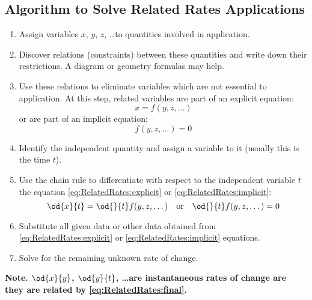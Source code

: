 \subsection{Algorithm to Solve Related Rates Applications}
	\begin{enumerate}
		\item Assign variables $x$, $y$, $z$, \dots to quantities involved in application.
		\item Discover relations (constraints) between these quantities and write down their restrictions. A diagram or geometry formulas may help.
		\item Use these relations to eliminate variables which are not essential to application.
			At this step, related variables are part of an explicit equation:
			\begin{equation}\label{eq:RelatedRates:explicit}
				x = f(y,z,\dots)
			\end{equation}
			or are part of an implicit equation:
			\begin{equation}\label{eq:RelatedRates:implicit}
				f(y,z,\dots) = 0
			\end{equation}
		\item Identify the independent quantity and assign a variable to it (usually this is the time $t$).
		\item Use the chain rule to differentiate with respect to the independent variable $t$ the equation \eqref{eq:RelatedRates:explicit} or \eqref{eq:RelatedRates:implicit}:
			\begin{equation}\label{eq:RelatedRates:final}
				\od{x}{t} = \od{}{t} f(y,z,\dots) \quad \text{or} \quad \od{}{t}f(y,z,\dots) = 0
			\end{equation}
		\item Substitute all given data or other data obtained from \eqref{eq:RelatedRates:explicit} or \eqref{eq:RelatedRates:implicit} equations.
		\item Solve for the remaining unknown rate of change.
	\end{enumerate}
	\textbf{Note. $\od{x}{y}$, $\od{y}{t}$, \dots are instantaneous rates of change are they are related by \eqref{eq:RelatedRates:final}.}

